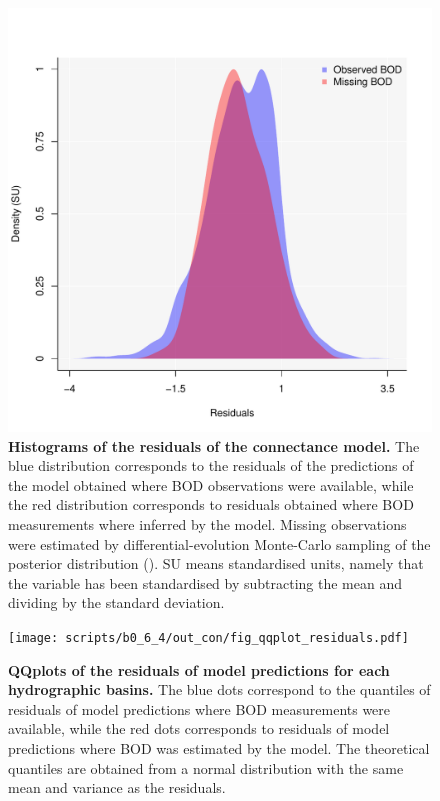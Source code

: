 \documentclass[11pt, oneside]{article}
\begin{document}
\begin{figure}[H]
\begin{center}
\includegraphics[page=1, width=1\linewidth]{scripts/b0_6_4/out_con/fig_hist_residuals.pdf}
\caption{
    \textbf{Histograms of the residuals of the connectance model.}
    The blue distribution corresponds to the residuals of the predictions of the model obtained where BOD observations were available, while the red distribution corresponds to residuals obtained where BOD measurements where inferred by the model.
    Missing observations were estimated by differential-evolution Monte-Carlo sampling of the posterior distribution (\cite{TerBraak2006}).
    SU means standardised units, namely that the variable has been standardised by subtracting the mean and dividing by the standard deviation.
} 
\end{center}
\end{figure}

\begin{figure}[H]
\begin{center}
\texttt{[image: scripts/b0\_6\_4/out\_con/fig\_qqplot\_residuals.pdf]}
\caption{
    \textbf{QQplots of the residuals of model predictions for each hydrographic basins.}
    The blue dots correspond to the quantiles of residuals of model predictions where BOD measurements were available, while the red dots corresponds to residuals of model predictions where BOD was estimated by the model.
    The theoretical quantiles are obtained from a normal distribution with the same mean and variance as the residuals.
} 
\end{center}
\end{figure}
\end{document}
